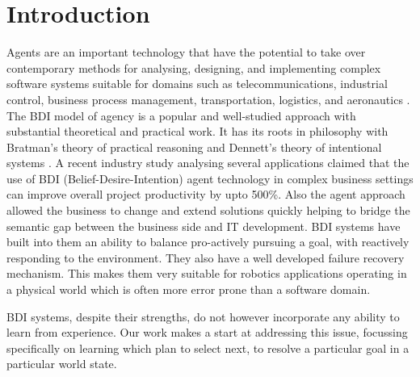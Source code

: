 \section{Introduction}\label{sec:intro}

Agents are an important technology that have the potential to take over
contemporary methods for analysing, designing, and implementing complex software
systems suitable for domains such as telecommunications, industrial control,
business process management, transportation, logistics, and aeronautics
\cite{Jennings:COMACM01,Belecheanu:AAMAS06,Ljungberg:PRICAI92-OASIS,Ziming:AAC07}.
The BDI model of agency \cite{Pollack:AIJ92-IRMA,Bratman88} is a popular and
well-studied approach with substantial theoretical and practical work. It has its
roots in philosophy with Bratman's \cite{Bratman87:Intentions} theory of practical
reasoning and Dennett's theory of intentional systems \cite{Dennet97:IntentionalStance}.
A recent industry study \cite{Benfield:AAMAS06} analysing several applications
claimed that the use of BDI (Belief-Desire-Intention) agent technology in complex
business settings can improve overall project productivity by upto
500\%. Also the agent approach allowed the business to change and extend
solutions quickly helping to bridge the semantic gap between the business side
and IT development.
BDI systems have built into them an ability to balance pro-actively
pursuing a goal, with reactively responding to the environment. They
also have a well developed failure recovery mechanism. This makes them
very suitable for robotics applications operating in a physical world
which is often more error prone than a software domain.

BDI systems, despite their strengths, do not however incorporate any
ability to learn from experience. Our work makes a start at addressing
this issue, focussing specifically on learning which plan to select next,
to resolve a particular goal in a particular world state.

